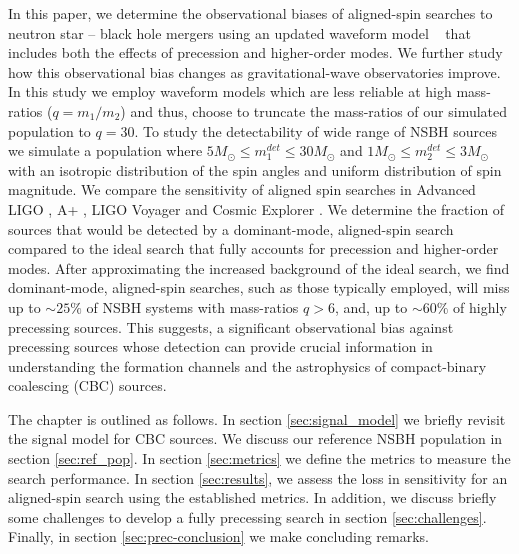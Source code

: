 In this paper, we determine the observational biases of aligned-spin searches to neutron star -- black hole mergers using an updated waveform model ~\cite{Pratten:2020ceb} that includes both the effects of precession and higher-order modes. We further study how this observational bias changes as gravitational-wave observatories improve. In this study we employ waveform models which are less reliable at high mass-ratios ($q = m_1/m_2$) \cite{Pratten:2020ceb} and thus, choose to truncate the mass-ratios of our simulated population to $q = 30$. To study the detectability of wide range of NSBH sources we simulate a population where $5 M_{\odot} \leq m_1^{det} \leq 30 M_{\odot}$ and $1 M_{\odot} \leq m_2^{det} \leq 3 M_{\odot}$ with an isotropic distribution of the spin angles and uniform distribution of spin magnitude. We compare the sensitivity of aligned spin searches in Advanced LIGO \cite{LIGOScientific:2014pky}, A+ \cite{Cahillane:2022pqm}, LIGO Voyager \cite{LIGO:2020xsf} and Cosmic Explorer \cite{Reitze:2019iox}. We determine the fraction of sources that would be detected by a dominant-mode, aligned-spin search compared to the ideal search that fully accounts for precession and higher-order modes. After approximating the increased background of the ideal search, we find dominant-mode, aligned-spin searches, such as those typically employed, will miss up to $\sim 25\%$ of NSBH systems with mass-ratios $q > 6$, and, up to $\sim 60\%$ of highly precessing sources. This suggests, a significant observational bias against precessing sources whose detection can provide crucial information in understanding the formation channels and the astrophysics of compact-binary coalescing (CBC) sources.

The chapter is outlined as follows. In section \ref{sec:signal_model} we briefly revisit the signal model for CBC sources. We discuss our reference NSBH population in section \ref{sec:ref_pop}. In section \ref{sec:metrics} we define the metrics to measure the search performance. In section \ref{sec:results}, we assess the loss in sensitivity for an aligned-spin search using the established metrics. In addition, we discuss briefly some challenges to develop a fully precessing search in section \ref{sec:challenges}. Finally, in section \ref{sec:prec-conclusion} we make concluding remarks.  


